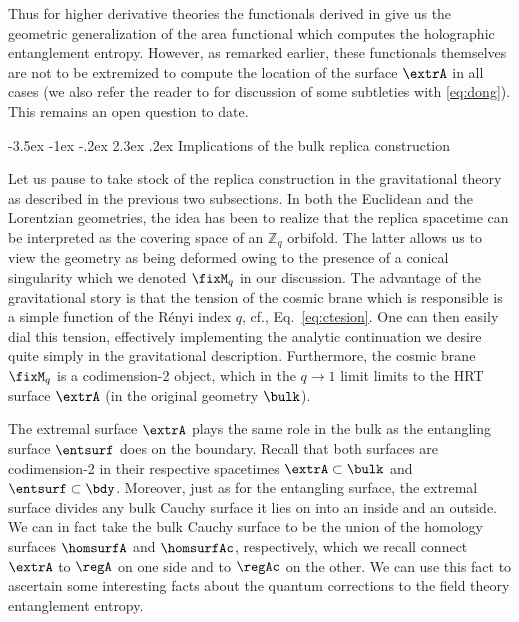 \documentclass[12pt,openany]{book}
\makeatletter
\renewcommand\section{\@startsection {section}{1}{\z@}%
                                   {-3.5ex \@plus -1ex \@minus -.2ex}%
                                   {2.3ex \@plus.2ex}%
                                   {\normalfont\large\bfseries}}
\makeatother
\begin{document}
Thus for  higher derivative theories the functionals derived in \cite{Dong:2013qoa,Camps:2013zua} give us the geometric generalization of the area functional which computes the holographic entanglement entropy. However, as remarked earlier,
these functionals themselves are not to be extremized to compute the location of the surface $\extrA$ in all cases (we also refer the reader to \cite{Miao:2015iba,Dong:2015zba,Camps:2016gfs} for discussion of some subtleties with \eqref{eq:dong}). This remains an open question to date. 


\section{Implications of the bulk replica construction}
\label{sec:bulkee}

Let us pause to take stock of the replica construction in the gravitational theory as described in the previous two subsections. In both the Euclidean and the Lorentzian geometries, the idea has been to realize that the replica spacetime can be interpreted as the covering space of an ${\mathbb Z}_q$ orbifold. The latter allows us to view the geometry as being deformed owing to the presence of a conical singularity which we denoted $\fixM_q$ in our discussion. The  advantage of the gravitational story is that the tension of the cosmic brane which is responsible is a simple function of the R\'enyi index $q$, cf., Eq.~\eqref{eq:ctesion}. One can then easily dial this tension, effectively implementing the analytic continuation we desire quite simply in the gravitational description. Furthermore, the cosmic brane $\fixM_q$ is a codimension-2 object, which in the $q \to 1$ limit limits to the HRT surface $\extrA$ (in the original geometry $\bulk$).

The extremal surface $\extrA$ plays the same role in the bulk as the entangling surface $\entsurf$ does on the boundary. Recall that both surfaces are codimension-2 in their respective spacetimes $\extrA \subset \bulk$ and $\entsurf \subset \bdy$. Moreover, just as for the entangling surface, the extremal surface divides any bulk Cauchy surface it lies on into an inside and an outside. We can in fact take the bulk Cauchy surface to be the union of the homology surfaces $\homsurfA$ and $\homsurfAc$, respectively, which we recall connect $\extrA$ to $\regA$ on one side and to $\regAc$ on the other. We can use this fact to ascertain some interesting facts about the quantum corrections to the field theory entanglement entropy.
\end{document}
